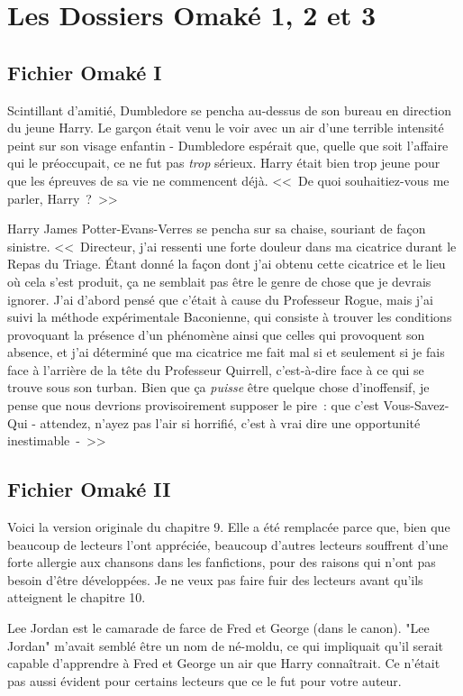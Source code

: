\chapter{Les Dossiers Omaké 1, 2 et 3}

\section{Fichier Omaké I}

Scintillant d'amitié, Dumbledore se pencha au-dessus de son bureau en direction du jeune Harry. Le garçon était venu le voir avec un air d'une terrible intensité peint sur son visage enfantin - Dumbledore espérait que, quelle que soit l'affaire qui le préoccupait, ce ne fut pas \emph{trop} sérieux. Harry était bien trop jeune pour que les épreuves de sa vie ne commencent déjà. <<~De quoi souhaitiez-vous me parler, Harry~?~>>

Harry James Potter-Evans-Verres se pencha sur sa chaise, souriant de façon sinistre. <<~Directeur, j'ai ressenti une forte douleur dans ma cicatrice durant le Repas du Triage. Étant donné la façon dont j'ai obtenu cette cicatrice et le lieu où cela s'est produit, ça ne semblait pas être le genre de chose que je devrais ignorer. J'ai d'abord pensé que c'était à cause du Professeur Rogue, mais j'ai suivi la méthode expérimentale Baconienne, qui consiste à trouver les conditions provoquant la présence d'un phénomène ainsi que celles qui provoquent son absence, et j'ai déterminé que ma cicatrice me fait mal si et seulement si je fais face à l'arrière de la tête du Professeur Quirrell, c'est-à-dire face à ce qui se trouve sous son turban. Bien que ça \emph{puisse} être quelque chose d'inoffensif, je pense que nous devrions provisoirement supposer le pire~: que c'est Vous-Savez-Qui - attendez, n'ayez pas l'air si horrifié, c'est à vrai dire une opportunité inestimable~-~>>

\section{Fichier Omaké II}

Voici la version originale du chapitre 9. Elle a été remplacée parce que, bien que beaucoup de lecteurs l'ont appréciée, beaucoup d'autres lecteurs souffrent d'une forte allergie aux chansons dans les fanfictions, pour des raisons qui n'ont pas besoin d'être développées. Je ne veux pas faire fuir des lecteurs avant qu'ils atteignent le chapitre 10.

Lee Jordan est le camarade de farce de Fred et George (dans le canon). "Lee Jordan" m'avait semblé être un nom de né-moldu, ce qui impliquait qu'il serait capable d'apprendre à Fred et George un air que Harry connaîtrait. Ce n'était pas aussi évident pour certains lecteurs que ce le fut pour votre auteur.


